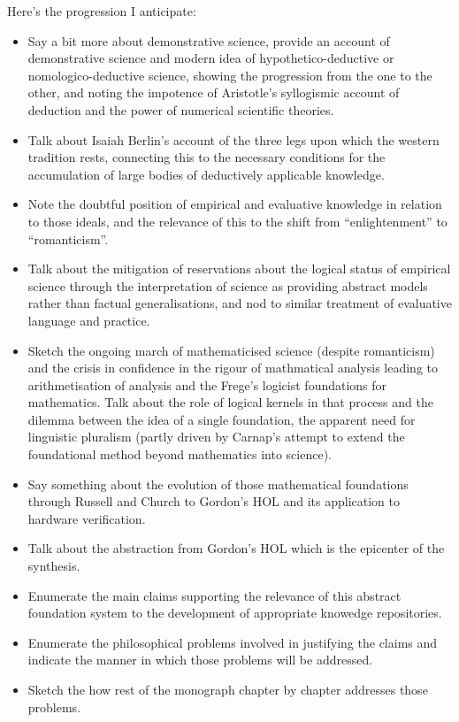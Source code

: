 \documentclass[10pt,titlepage]{book}
\begin{document}
Here's the progression I anticipate:
\begin{itemize}
\item Say a bit more about demonstrative science, provide an account of demonstrative science and modern idea of hypothetico-deductive or nomologico-deductive science, showing the progression from the one to the other, and noting the impotence of Aristotle's syllogismic account of deduction and the power of numerical scientific theories.
\item Talk about Isaiah Berlin's account of the three legs upon which the western tradition rests, connecting this to the necessary conditions for the accumulation of large bodies of deductively applicable knowledge.
\item Note the doubtful position of empirical and evaluative knowledge in relation to those ideals, and the relevance of this to the shift from ``enlightenment'' to ``romanticism''.
\item Talk about the mitigation of reservations about the logical status of empirical science through the interpretation of science as providing abstract models rather than factual generalisations, and nod to similar treatment of evaluative language and practice.
\item Sketch the ongoing march of mathematicised science (despite romanticism) and the crisis in confidence in the rigour of mathmatical analysis leading to arithmetisation of analysis and the Frege's logicist foundations for mathematics.
  Talk about the role of logical kernels in that process and the dilemma between the idea of a single foundation, the apparent need for linguistic pluralism (partly driven by Carnap's attempt to extend the foundational method beyond mathematics into science).
\item Say something about the evolution of those mathematical foundations through Russell and Church to Gordon's HOL and its application to hardware verification.

\item Talk about the abstraction from Gordon's HOL which is the epicenter of the synthesis.
\item Enumerate the main claims supporting the relevance of this abstract foundation system to the development of appropriate knowedge repositories.
\item Enumerate the philosophical problems involved in justifying the claims and indicate the manner in which those problems will be addressed.
\item Sketch the how rest of the monograph chapter by chapter addresses those problems.
\end{itemize}
\end{document}
